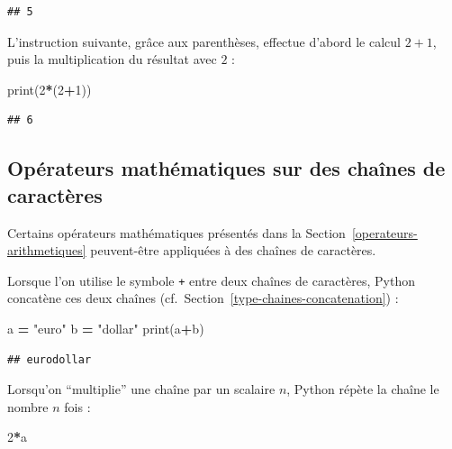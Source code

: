 \documentclass[12pt,]{book}
\newenvironment{Shaded}{\begin{snugshade}}{\end{snugshade}}
\newcommand{\DecValTok}[1]{\textcolor[rgb]{0.00,0.00,0.81}{#1}}
\newcommand{\StringTok}[1]{\textcolor[rgb]{0.31,0.60,0.02}{#1}}
\newcommand{\OperatorTok}[1]{\textcolor[rgb]{0.81,0.36,0.00}{\textbf{#1}}}
\newcommand{\BuiltInTok}[1]{#1}
\newcommand{\NormalTok}[1]{#1}
\numberwithin{equation}{section}
\numberwithin{countremarque}{section}
\begin{document}
\begin{lstlisting}
## 5
\end{lstlisting}

L'instruction suivante, grâce aux parenthèses, effectue d'abord le
calcul \(2+1\), puis la multiplication du résultat avec \(2\) :

\begin{Shaded}
\begin{Highlighting}[]
\BuiltInTok{print}\NormalTok{(}\DecValTok{2}\OperatorTok{*}\NormalTok{(}\DecValTok{2}\OperatorTok{+}\DecValTok{1}\NormalTok{)) }
\end{Highlighting}
\end{Shaded}

\begin{lstlisting}
## 6
\end{lstlisting}

\subsection{Opérateurs mathématiques sur des chaînes de
caractères}\label{operateurs-mathematiques-sur-des-chaines-de-caracteres}

Certains opérateurs mathématiques présentés dans la
Section~\ref{operateurs-arithmetiques} peuvent-être appliquées à des
chaînes de caractères.

Lorsque l'on utilise le symbole \texttt{+} entre deux chaînes de
caractères, Python concatène ces deux chaînes
(cf.~Section~\ref{type-chaines-concatenation}) :

\begin{Shaded}
\begin{Highlighting}[]
\NormalTok{a }\OperatorTok{=} \StringTok{"euro"}
\NormalTok{b }\OperatorTok{=} \StringTok{"dollar"}
\BuiltInTok{print}\NormalTok{(a}\OperatorTok{+}\NormalTok{b)}
\end{Highlighting}
\end{Shaded}

\begin{lstlisting}
## eurodollar
\end{lstlisting}

Lorsqu'on ``multiplie'' une chaîne par un scalaire \(n\), Python répète
la chaîne le nombre \(n\) fois :

\begin{Shaded}
\begin{Highlighting}[]
\DecValTok{2}\OperatorTok{*}\NormalTok{a}
\end{Highlighting}
\end{Shaded}
\end{document}
